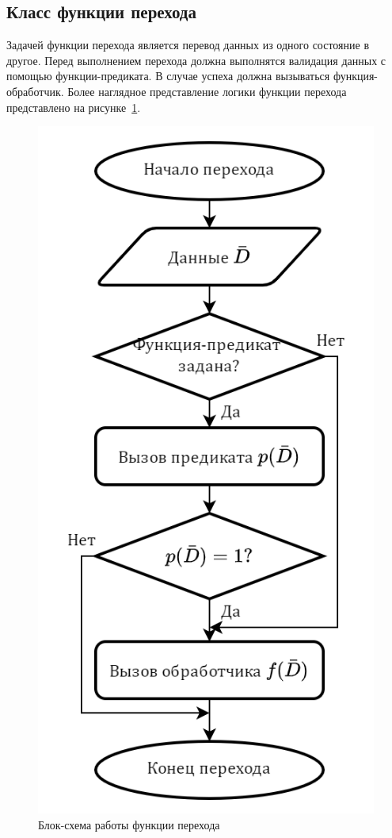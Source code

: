 \subsection{Класс функции перехода}
Задачей функции перехода является перевод данных из одного состояние в другое. Перед выполнением перехода должна выполнятся валидация данных с помощью функции-предиката. В случае успеха должна вызываться функция-обработчик. Более наглядное представление логики функции перехода представлено на рисунке~\ref{fig:flowchartTransfer}.
\begin{figure}[!ht]
    \centering
    \includegraphics[height=0.4\textheight]{figures/flowchart.transfer.png}
    \caption{Блок-схема работы функции перехода}
    \label{fig:flowchartTransfer}
\end{figure}

